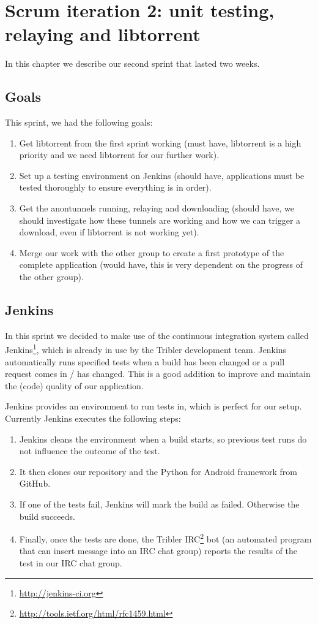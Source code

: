 \chapter{Scrum iteration 2: unit testing, relaying and libtorrent}
\label{cpt:iteration2}
	In this chapter we describe our second sprint that lasted two weeks.

	\section{Goals}
		This sprint, we had the following goals:
	
		\begin{enumerate}
			\item Get libtorrent from the first sprint working (must have, libtorrent is a high priority and we need libtorrent for our further work).
			\item Set up a testing environment on Jenkins (should have, applications must be tested thoroughly to ensure everything is in order).
			\item Get the anontunnels running, relaying and downloading (should have, we should investigate how these tunnels are working and how we can trigger a download, even if libtorrent is not working yet).
			\item Merge our work with the other group to create a first prototype of the complete application (would have, this is very dependent on the progress of the other group).
		\end{enumerate}
	
	\section{Jenkins}
		\label{sec:jenkins}
		In this sprint we decided to make use of the continuous integration system called Jenkins\footnote{\url{http://jenkins-ci.org}}, which is already in use by the Tribler development team. Jenkins automatically runs specified tests when a build has been changed or a pull request comes in / has changed. This is a good addition to improve and maintain the (code) quality of our application.
		
		Jenkins provides an environment to run tests in, which is perfect for our setup. Currently Jenkins executes the following steps:
		
		\begin{enumerate}
			\item Jenkins cleans the environment when a build starts, so previous test runs do not influence the outcome of the test.
			\item It then clones our repository and the Python for Android framework from GitHub.
			\item If one of the tests fail, Jenkins will mark the build as failed. Otherwise the build succeeds.
			\item Finally, once the tests are done, the Tribler IRC\footnote{\url{http://tools.ietf.org/html/rfc1459.html}} bot (an automated program that can insert message into an IRC chat group) reports the results of the test in our IRC chat group.
		\end{enumerate} 
		

